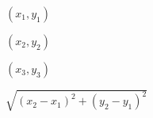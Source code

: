 \documentclass{article}
\begin{document}
$(x_1,y_1)$
\pagebreak

$(x_2,y_2)$
\pagebreak

$(x_3, y_3)$
\pagebreak

$\sqrt{(x_2-x_1)^2+(y_2-y_1)^2}$
\pagebreak
\end{document}
